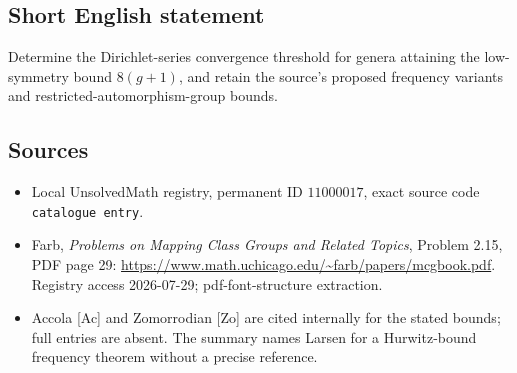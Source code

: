 \documentclass[11pt]{article}
\begin{document}
\subsection{Short English statement}
Determine the Dirichlet-series convergence threshold for genera attaining the low-symmetry bound \(8(g+1)\), and retain the source's proposed frequency variants and restricted-automorphism-group bounds.
\subsection{Sources}
\begin{itemize}
\item Local UnsolvedMath registry, permanent ID \(11000017\), exact source code \texttt{catalogue entry}.
\item Farb, \emph{Problems on Mapping Class Groups and Related Topics}, Problem 2.15, PDF page 29: \url{https://www.math.uchicago.edu/~farb/papers/mcgbook.pdf}. Registry access 2026-07-29; pdf-font-structure extraction.
\item Accola [Ac] and Zomorrodian [Zo] are cited internally for the stated bounds; full entries are absent. The summary names Larsen for a Hurwitz-bound frequency theorem without a precise reference.
\end{itemize}
\end{document}
